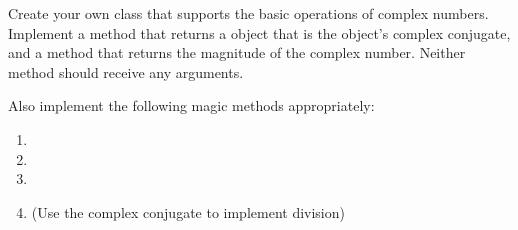 \begin{problem}
Create your own  class that supports the basic operations of complex numbers. Implement a  method that returns a  object that is the object's complex conjugate, and a  method that returns the magnitude of the complex number.
Neither method should receive any arguments.

Also implement the following magic methods appropriately:
\begin{enumerate}
\item {}
\item {}
\item {}
\item {} (Use the complex conjugate to implement division)
\end{enumerate}
\end{problem}

